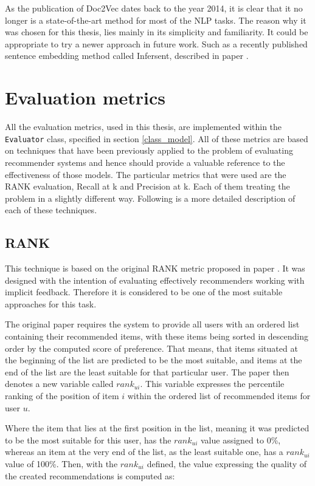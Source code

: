 As the publication of Doc2Vec dates back to the year 2014, it is clear that it no longer is a state-of-the-art method for most of the NLP tasks. The reason why it was chosen for this thesis, lies mainly in its simplicity and familiarity. It could be appropriate to try a newer approach in future work. Such as a recently published sentence embedding method called Infersent, described in paper \cite{InferSent}.


\chapter{Evaluation metrics} \label{eval_metrics}
All the evaluation metrics, used in this thesis, are implemented within the \texttt{Evaluator} class, specified in section \ref{class_model}. All of these metrics are based on techniques that have been previously applied to the problem of evaluating recommender systems and hence should provide a valuable reference to the effectiveness of those models. The particular metrics that were used are the RANK evaluation, Recall at k and Precision at k. Each of them treating the problem in a slightly different way. Following is a more detailed description of each of these techniques.

\section{RANK}
This technique is based on the original RANK metric proposed in paper \cite{Implicit}. It was designed with the intention of evaluating effectively recommenders working with implicit feedback. Therefore it is considered to be one of the most suitable approaches for this task. 

The original paper requires the system to provide all users with an ordered list containing their recommended items, with these items being sorted in descending order by the computed score of preference. That means, that items situated at the beginning of the list are predicted to be the most suitable, and items at the end of the list are the least suitable for that particular user. The paper then denotes a new variable called $rank_{ui}$. This variable expresses the percentile ranking of the position of item $i$ within the ordered list of recommended items for user $u$.

Where the item that lies at the first position in the list, meaning it was predicted to be the most suitable for this user, has the $rank_{ui}$ value assigned to 0\%, whereas an item at the very end of the list, as the least suitable one, has a $rank_{ui}$ value of 100\%. Then, with the $rank_{ui}$ defined, the value expressing the quality of the created recommendations is computed as:

